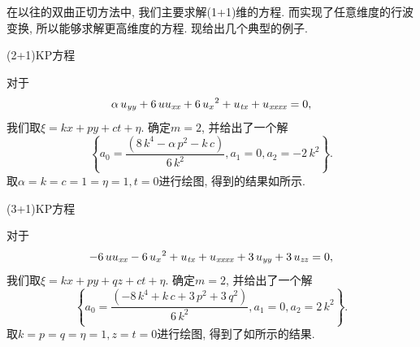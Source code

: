 在以往的双曲正切方法中, 我们主要求解(1+1)维的方程. 而实现了任意维度的行波变换, 所以能够求解更高维度的方程. 现给出几个典型的例子.

\begin{example}(2+1)KP方程\CITEbaKP{}

对于
\begin{equation}
    \alpha\,u_{{{\it yy}}}+6\,uu_{{{\it xx}}}+6\,{u_{{x}}}^{2}+u_{{{\it tx}}}+u_{{{\it xxxx}}}=0,
\end{equation}
我们取$\xi=kx+py+ct+\eta$. 确定$m=2$, 并给出了一个解
\begin{equation}
    \left\{ {{a}_{0}}=\frac{\left( 8\,{k}^{4}-\alpha\,{p}^{2}-k\,c\right) }{6\,{k}^{2}},{{a}_{1}}=0,{{a}_{2}}=-2\,{k}^{2}\right\} .
\end{equation}
取$\alpha=k=c=1=\eta=1,t=0$进行绘图, 得到的结果如所示.
\end{example}

\begin{example}(3+1)KP方程\CITEcaKP{}

对于
\begin{equation}
    -6\,uu_{{{\it xx}}}-6\,{u_{{x}}}^{2}+u_{{{\it tx}}}+u_{{{\it xxxx}}}+3\,u_{{{\it yy}}}+3\,u_{{{\it zz}}}=0,
\end{equation}
我们取$\xi=kx+py+qz+ct+\eta$. 确定$m=2$, 并给出了一个解
\begin{equation}
    \left\{ {{a}_{0}}=\frac{\left( -8\,{k}^{4}+k\,c+3\,{p}^{2}+3\,{q}^{2}\right) }{6\,{k}^{2}},{{a}_{1}}=0,{{a}_{2}}=2\,{k}^{2}\right\} .
\end{equation}
取$k=p=q=\eta=1,z=t=0$进行绘图, 得到了如所示的结果. 
\end{example}

